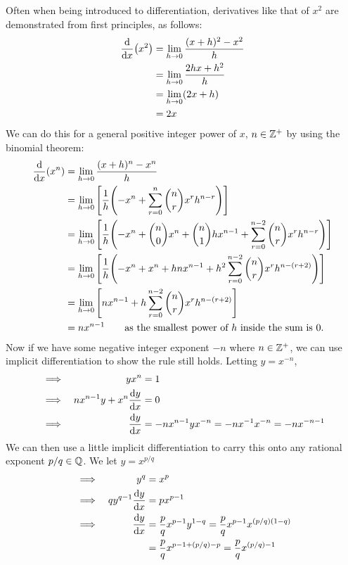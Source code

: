 Often when being introduced to differentiation, derivatives like that of
\(x^2\) are demonstrated from first principles, as follows:
\begin{align*}
\dv{x}(x^2) &= \lim_{h \to 0} \frac{(x + h)^2 - x^2} h \\
    &= \lim_{h \to 0} \frac{2hx + h^2} h \\
    &= \lim_{h \to 0} (2x + h) \\
    &= 2x
\end{align*}
We can do this for a general positive integer power of \(x\),
\(n \in \mathbb Z^+\) by using the binomial theorem:
\begin{align*}
\dv{x}(x^n) &= \lim_{h \to 0} \frac{(x + h)^n - x^n} h \\
    &= \lim_{h \to 0} \bqty{\frac 1h \pqty{-x^n
                          + \sum_{r = 0}^n \binom nr x^r h^{n - r}}} \\
    &= \lim_{h \to 0} \bqty{\frac 1h \pqty{
                            -x^n + \binom n0 x^n + \binom n1 hx^{n - 1}
                          + \sum_{r = 0}^{n - 2}
                                \binom nr x^r h^{n - r}}} \\
    &= \lim_{h \to 0} \bqty{\frac 1h \pqty{-x^n + x^n + hnx^{n - 1}
                          + h^2 \sum_{r = 0}^{n - 2}
                                \binom nr x^r h^{n - (r + 2)}}} \\
    &= \lim_{h \to 0} \bqty{nx^{n - 1} + h \sum_{r = 0}^{n - 2}
                                \binom nr x^r h^{n - (r + 2)}} \\
    &= nx^{n-1} \qquad
        \text{as the smallest power of \(h\) inside the sum is 0.}
\end{align*}
Now if we have some negative integer exponent \(-n\) where
\(n \in \mathbb Z^+\), we can use implicit differentiation to show the rule
still holds. Letting \(y = x^{-n}\),
\begin{alignat*}{2}
&\implies& yx^n &= 1 \\
&\implies& nx^{n - 1}y + x^n \dv{y}{x} &= 0 \\
&\implies& \dv{y}{x} &= -nx^{n - 1}yx^{-n}
    = -nx^{-1}x^{-n} = -nx^{-n - 1}
\end{alignat*}
We can then use a little implicit differentiation to carry this onto any
rational exponent \(p / q \in \mathbb Q\). We let \(y = x^{p / q}\)
\begin{alignat*}{2}
&\implies& y^q &= x^p \\
&\implies& qy^{q - 1}\dv{y}{x} &= px^{p - 1} \\
&\implies& \dv{y}{x} &= \frac pq x^{p - 1}y^{1 - q}
    = \frac pq x^{p - 1}x^{(p / q)(1 - q)} \\
&&  &= \frac pq x^{p - 1 + (p / q) - p}
    = \frac pq x^{(p / q) - 1}
\end{alignat*}

